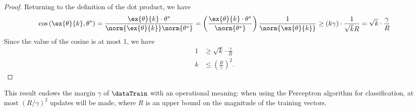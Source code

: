 \begin{proof}
  Returning to the definition of the dot product, we have
  \[\cos\left(\ex{\theta}{k}, \theta^*\right)
    = \frac{\ex{\theta}{k} \cdot \theta^*}{\norm{\ex{\theta}{k}}
      \norm{\theta^*}}
    = \left(\frac{\ex{\theta}{k} \cdot \theta^*}{\norm{\theta^*}}\right)
    \frac{1}{\norm{\ex{\theta}{k}}}
    \geq (k\gamma)\cdot \frac{1}{\sqrt{k}R} = \sqrt{k}\cdot\frac{\gamma}{R}\]
  Since the value of the cosine is at most 1, we have
  \begin{align*}
    1 & \geq \sqrt{k} \cdot \frac{\gamma}{R}  \\
    k & \leq \left(\frac{R}{\gamma}\right)^2.
  \end{align*}
\end{proof}

This result endows the margin $\gamma$ of $\dataTrain$ with an
operational meaning: when using the Perceptron algorithm for
classification, at most $(R/\gamma)^2$ updates will be
made, where $R$ is an upper bound on the magnitude of the training
vectors.


